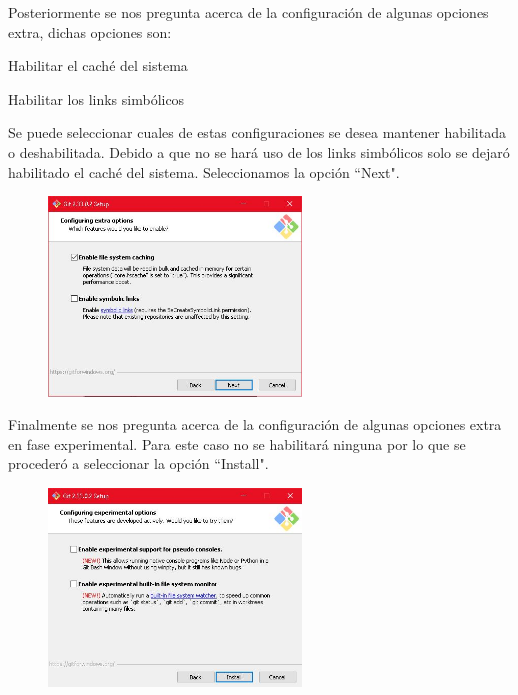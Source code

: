 \documentclass[10pt,a4paper]{article} %
\begin{document}
\begin{enumerate}
{			\pagebreak
			\item Posteriormente se nos pregunta acerca de la configuraci{\' o}n de algunas opciones extra, dichas opciones son:
			\begin{itemize}
				{
					\item Habilitar el cach{\' e} del sistema
					\item Habilitar los links simb{\' o}licos
				}
			\end{itemize}
			Se puede seleccionar cuales de estas configuraciones se desea mantener habilitada o deshabilitada. Debido a que no se har{\' a} uso de los links simb{\' o}licos solo se dejar{\' o} habilitado el cach{\' e} del sistema. Seleccionamos la opci{\' o}n ``Next".
			\begin{figure}[H]
				\includegraphics[width=0.6\textwidth]{17.jpg}
				\centering
				\label{img:paso17}
			\end{figure}
			\item Finalmente se nos pregunta acerca de la configuraci{\' o}n de algunas opciones extra en fase experimental. Para este caso no se habilitar{\' a} ninguna por lo que se proceder{\' o} a seleccionar la opci{\' o}n ``Install".
			\begin{figure}[H]
				\includegraphics[width=0.6\textwidth]{18.jpg}
				\centering
				\label{img:paso18}
			\end{figure}
			
}
\end{enumerate}
\end{document}

